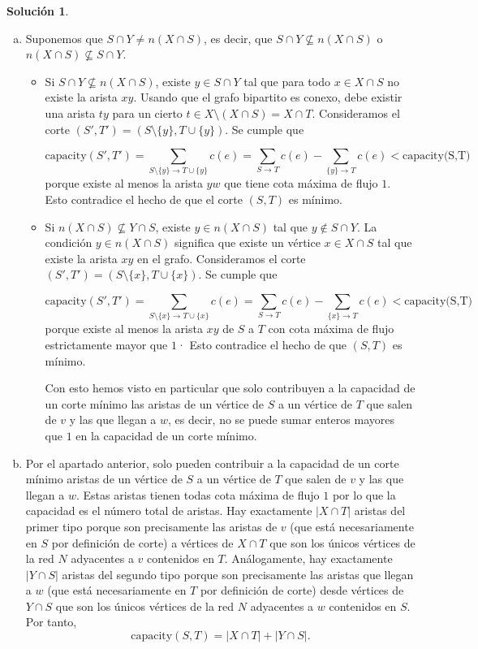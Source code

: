 \documentclass[10pt]{article}
\theoremstyle{definition}
\newtheorem*{sol}{Solución}
\begin{document}
\begin{sol}
\begin{enumerate}[(a)]
\item

Suponemos que $S\cap Y\neq n(X\cap S)$, es decir, que $S\cap Y\nsubseteq n(X\cap S)$ o $n(X\cap S)\nsubseteq S\cap Y$.
\begin{itemize}
\item Si $S\cap Y\nsubseteq n(X\cap S)$, existe $y\in S\cap Y$ tal que para todo $x\in X\cap S$ no existe la arista $xy$. Usando que el grafo bipartito es conexo, debe existir una arista $ty$ para un cierto $t\in X\setminus (X\cap S)=X\cap T$. Consideramos el corte $(S',T')=(S\setminus \{y\},T\cup\{y\})$. Se cumple que 

$$\text{capacity}(S',T')=\sum_{S\setminus \{y\}\longrightarrow T\cup\{y\}}c(e)=\sum_{S\longrightarrow T}c(e)-\sum_{\{y\}\longrightarrow T}c(e)< \text{capacity(S,T)}$$
porque existe al menos la arista $yw$ que tiene cota máxima de flujo $1$. Esto contradice el hecho de que el corte $(S,T)$ es mínimo.

\item Si $n(X\cap S)\nsubseteq Y\cap S$, existe $y\in n(X\cap S)$ tal que $y\notin S\cap Y$. La condición $y\in n(X\cap S)$ significa que existe un vértice $x\in X\cap S$ tal que existe la arista $xy$ en el grafo. Consideramos el corte $(S',T')=(S\setminus\{x\},T\cup\{x\})$. Se cumple que

$$\text{capacity}(S',T')=\sum_{S\setminus \{x\}\longrightarrow T\cup\{x\}}c(e)=\sum_{S\longrightarrow T}c(e)-\sum_{\{x\}\longrightarrow T}c(e)< \text{capacity(S,T)}$$
porque existe al menos la arista $xy$ de $S$ a $T$ con cota máxima de flujo estrictamente mayor que $1$· Esto contradice el hecho de que $(S,T)$ es mínimo.

Con esto hemos visto en particular que solo contribuyen a la capacidad de un corte mínimo  las aristas de un vértice de $S$ a un vértice de $T$ que salen de $v$ y las que llegan a $w$, es decir, no se puede sumar enteros mayores que $1$ en la capacidad de un corte mínimo.
\end{itemize}

\item Por el apartado anterior, solo pueden contribuir a la capacidad de un corte mínimo aristas de un vértice de $S$ a un vértice de $T$ que salen de $v$ y las que llegan a $w$. Estas aristas tienen todas cota máxima de flujo $1$ por lo que la capacidad es el número total de aristas. Hay exactamente $|X\cap T|$ aristas del primer tipo porque son precisamente las aristas de $v$ (que está necesariamente en $S$ por definición de corte) a vértices de $X\cap T$ que son los únicos vértices de la red $N$ adyacentes a $v$ contenidos en $T$. Análogamente, hay exactamente $|Y\cap S|$ aristas del segundo tipo porque son precisamente las aristas que llegan a $w$ (que está necesariamente en $T$ por definición de corte) desde vértices de $Y\cap S$ que son los únicos vértices de la red $N$ adyacentes a $w$ contenidos en $S$. Por tanto,
$$\text{capacity}(S,T)=|X\cap T|+|Y\cap S|.$$


\end{enumerate}
\end{sol}
\end{document}
